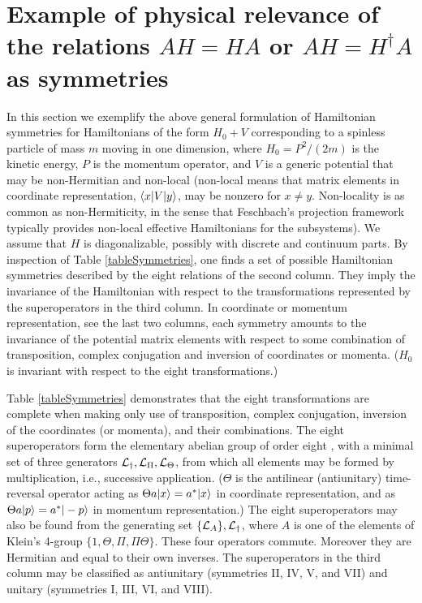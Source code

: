 \section{Example of physical relevance of the relations $AH=HA$ or $AH=H^\dagger A$ as symmetries}
%
%
%
%
In this section we exemplify the above general formulation of Hamiltonian symmetries
for Hamiltonians
of the form $H_0+V$ corresponding to a  spinless particle of mass $m$ moving in one dimension,
where $H_0=P^2/(2m)$
is the kinetic energy, $P$ is the  momentum operator, and $V$ is a generic potential that may be
non-Hermitian and non-local (non-local means that matrix elements in coordinate representation,
$\langle x|V|y\rangle$, may be nonzero  for
$x\ne y$. Non-locality is as common as non-Hermiticity, in the sense that Feschbach's projection framework
typically  provides non-local effective Hamiltonians for the subsystems).
We assume that $H$ is diagonalizable, possibly with discrete and continuum parts.
By inspection of  Table \ref{tableSymmetries}, one finds a set of possible Hamiltonian symmetries described
by the eight relations of the second column. They imply  the invariance of the Hamiltonian with respect to the
transformations represented by the superoperators in the third column.
In coordinate or momentum representation, see the last two columns,
each symmetry amounts to the invariance of the potential matrix elements with respect to some combination
of transposition, complex conjugation and inversion of coordinates or momenta.
($H_0$ is invariant with respect to the eight transformations.)

Table \ref{tableSymmetries} demonstrates that the eight transformations are complete when
making only use of transposition, complex conjugation, inversion of the coordinates (or momenta),
and their combinations.
The eight superoperators form the elementary abelian group of order eight \cite{Rose2009},
with a minimal set of three generators
${\cal L}_\dagger, {\cal L}_\Pi, {\cal L}_\Theta$, from which all elements may be formed by multiplication,
i.e., successive
application. ($\Theta$ is the antilinear (antiunitary) time-reversal operator acting as
$\Theta a |x\rangle=a^*|x\rangle$ in coordinate representation, and as $\Theta a |p\rangle=a^*|-p\rangle$ in momentum
representation.)
The eight superoperators may also be found from the generating set $\{{\cal L}_A\}, {\cal L}_\dagger$,
where  $A$ is one of the elements of Klein's 4-group
$\{1, \Theta,\Pi,\Pi\Theta\}$.  These four operators commute. Moreover they are Hermitian and  equal to their own inverses.
The superoperators in the third column may be classified as antiunitary (symmetries II, IV, V, and VII)
and unitary (symmetries I, III, VI, and VIII).


